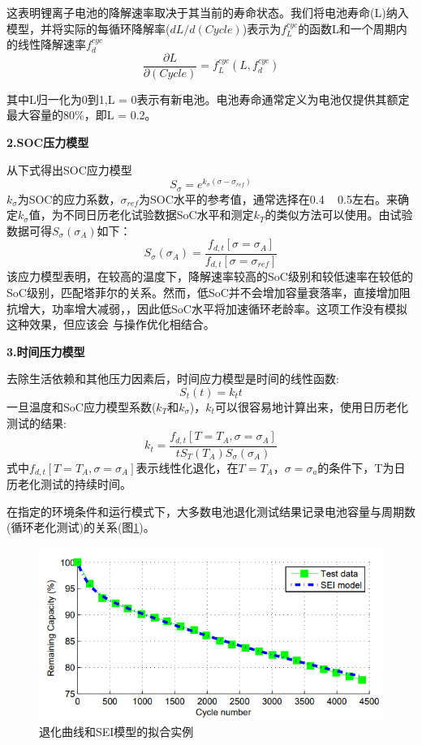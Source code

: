 \documentclass[12pt]{ctexart}%
\begin{document}
这表明锂离子电池的降解速率取决于其当前的寿命状态。我们将电池寿命(L)纳入模型，并将实际的每循环降解率($dL/d(Cycle)$)表示为$f_L^{cyc}$的函数L和一个周期内的线性降解速率$f_d^{cyc}$
$$\frac{\partial L}{\partial(Cycle)} = f_L^{cyc}(L,f_d^{cyc})$$

其中L归一化为0到1,L = 0表示有新电池。电池寿命通常定义为电池仅提供其额定最大容量的80\%，即L = 0.2。

\noindent\textbf{2.SOC压力模型}

从下式得出SOC应力模型
$$S_\sigma = e^{k_\sigma(\sigma - \sigma_{ref})}$$
$k_\sigma$为SOC的应力系数，$\sigma_{ref}$为SOC水平的参考值，通常选择在0.4 ~ 0.5左右。来确定$k_\sigma$值，为不同日历老化试验数据SoC水平和测定$k_T$的类似方法可以使用。由试验数据可得$S_\sigma(\sigma_A)$如下：
$$S_{\sigma}(\sigma_A) = \frac{f_{d,t}[\sigma=\sigma_A]}{f_{d,t}[\sigma=\sigma_{ref}]}$$
该应力模型表明，在较高的温度下，降解速率较高的SoC级别和较低速率在较低的SoC级别，匹配塔菲尔的关系。然而，低SoC并不会增加容量衰落率，直接增加阻抗增大，功率增大减弱\cite{VETTER2005269}，\cite{AMINE2001684}，因此低SoC水平将加速循环老龄率。这项工作没有模拟这种效果，但应该会 与操作优化相结合。

\noindent\textbf{3.时间压力模型}

去除生活依赖和其他压力因素后，时间应力模型是时间的线性函数:
$$S_t(t) = k_tt$$
一旦温度和SoC应力模型系数($k_T$和$k_\sigma$)，$k_t$可以很容易地计算出来，使用日历老化测试的结果: 
$$k_t = \frac{f_{d,t}[T=T_A,\sigma=\sigma_A]}{tS_T(T_A)S_{\sigma}(\sigma_A)}$$
式中$f_{d,t}[T=T_A,\sigma=\sigma_A]$表示线性化退化，在$T = T_A$，$\sigma = \sigma_a$的条件下，T为日历老化测试的持续时间。

在指定的环境条件和运行模式下，大多数电池退化测试结果记录电池容量与周期数(循环老化测试)的关系(图\ref{y})。

\begin{figure}[H]
	\centering
	\includegraphics[scale = 0.6]{4}
	\caption{退化曲线和SEI模型的拟合实例}
	\label{y}
\end{figure}
\end{document}
